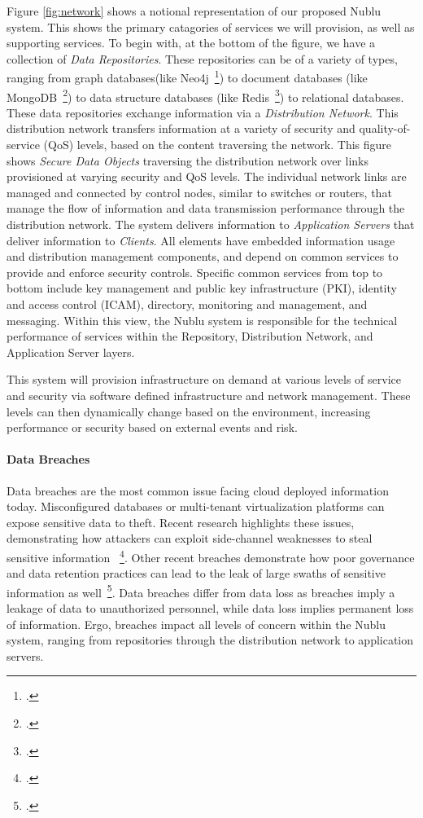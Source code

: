 \documentclass[10pt,letterpaper]{article}
\begin{document}
Figure \ref{fig:network} shows a notional representation of our proposed Nublu system.  This shows the primary catagories of services we will provision, as well as supporting services.  To begin with, at the bottom of the figure, we have a collection of {\sl Data Repositories}.  These repositories can be of a variety of types, ranging from graph databases(like Neo4j~\footcite{neo4j}) to document databases (like MongoDB~\footcite{mongodb}) to data structure databases (like Redis~\footcite{redis}) to relational databases. These data repositories exchange information via a {\sl Distribution Network}.  This distribution network transfers information at a variety of security and quality-of-service (QoS) levels, based on the content traversing the network.  This figure shows {\sl Secure Data Objects} traversing the distribution network over links provisioned at varying security and QoS levels.  The individual network links are managed and connected by control nodes, similar to switches or routers, that manage the flow of information and data transmission performance through the distribution network.  The system delivers information to {\sl Application Servers} that deliver information to {\sl Clients}.  All elements have embedded information usage and distribution management components, and depend on common services to provide and enforce security controls.  Specific common services from top to bottom include key management and public key infrastructure (PKI), identity and access control (ICAM), directory, monitoring and management, and messaging.  Within this view, the Nublu system is responsible for the technical performance of services within the Repository, Distribution Network, and Application Server layers.

This system will provision infrastructure on demand at various levels of service and security via software defined infrastructure and network management. These levels can then dynamically change based on the environment, increasing performance or security based on external events and risk.

\paragraph{Data Breaches} Data breaches are the most common issue facing cloud deployed information today.  Misconfigured databases or multi-tenant virtualization platforms can expose sensitive data to theft.  Recent research highlights these issues, demonstrating how attackers can exploit side-channel weaknesses to steal sensitive information ~\footcite{ZhJuReRi:12}.  Other recent breaches demonstrate how poor governance and data retention practices can lead to the leak of large swaths of sensitive information as well~\footcite{De:12}.  Data breaches differ from data loss as breaches imply a leakage of data to unauthorized personnel, while data loss implies permanent loss of information.  Ergo, breaches impact all levels of concern within the Nublu system, ranging from repositories through the distribution network to application servers. 
\end{document}
